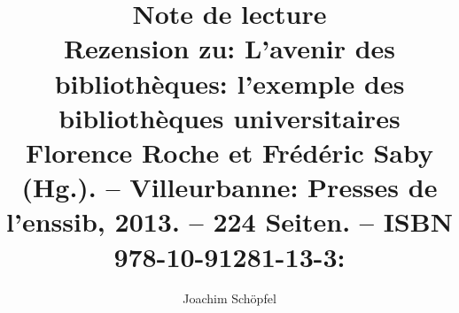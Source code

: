 

\title{\LARGE{Note de lecture} \\ \large{Rezension zu: L’avenir des bibliothèques: l’exemple des bibliothèques
universitaires \/ Florence Roche et Frédéric Saby (Hg.). – Villeurbanne:
Presses de l’enssib, 2013. – 224 Seiten. – ISBN 978-10-91281-13-3: }} %
\author{Joachim Schöpfel} %